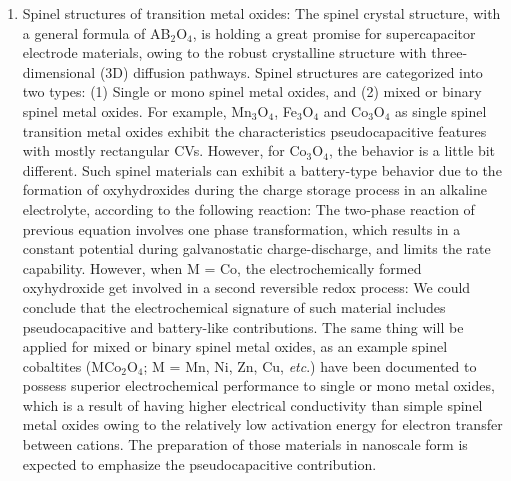 \documentclass[reprint,amsmath,amssymb,aps,floatfix,
]{revtex4-2}
\begin{document}
\begin{enumerate}
    \item Spinel structures of transition metal oxides: The spinel crystal structure, with a general formula of AB$_2$O$_4$, is holding a great promise for supercapacitor electrode materials, owing to the robust crystalline structure with three-dimensional (3D) diffusion pathways. Spinel structures are categorized into two types: (1) Single or mono spinel metal oxides, and (2) mixed or binary spinel metal oxides. For example, Mn$_3$O$_4$, Fe$_3$O$_4$ and Co$_3$O$_4$ as single spinel transition metal oxides exhibit the characteristics pseudocapacitive features with mostly rectangular CVs.\cite{Jeong2012} However, for Co$_3$O$_4$, the behavior is a little bit different.\cite{Wang2000} Such spinel materials can exhibit a battery-type behavior due to the formation of oxyhydroxides during the charge storage process in an alkaline electrolyte, according to the following reaction:\cite{Changzhou2013}  The two-phase reaction of previous equation involves one phase transformation, which results in a constant potential during galvanostatic charge-discharge, and limits the rate capability. However, when M = Co, the electrochemically formed oxyhydroxide get involved in a second reversible redox process:  We could conclude that the electrochemical signature of such material includes pseudocapacitive and battery-like contributions. The same thing will be applied for mixed or binary spinel metal oxides, as an example spinel cobaltites (MCo$_2$O$_4$;  M = Mn, Ni, Zn, Cu, {\it etc}.) have been documented to possess superior electrochemical performance to single or mono metal oxides,\cite{Qiufan2012} which is a result of having higher electrical conductivity than simple spinel metal oxides owing to the relatively low activation energy for electron transfer between cations.\cite{Linfeng2012} The preparation of those materials in nanoscale form is expected to emphasize the pseudocapacitive contribution. 
\end{enumerate}
\end{document}

